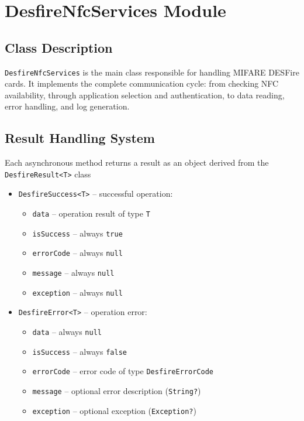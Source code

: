 \documentclass[a4paper,12pt]{article}
\begin{document}
\section{DesfireNfcServices Module}

\subsection{Class Description}
\texttt{DesfireNfcServices} is the main class responsible for handling MIFARE DESFire cards. It implements the complete communication cycle: from checking NFC availability, through application selection and authentication, to data reading, error handling, and log generation.

\subsection{Result Handling System}
Each asynchronous method returns a result as an object derived from the \texttt{DesfireResult<T>} class

\begin{itemize}
    \item \texttt{DesfireSuccess<T>} -- successful operation:
    \begin{itemize}
        \item \texttt{data} -- operation result of type \texttt{T}
        \item \texttt{isSuccess} -- always \texttt{true}
        \item \texttt{errorCode} -- always \texttt{null}
        \item \texttt{message} -- always \texttt{null}
        \item \texttt{exception} -- always \texttt{null}
    \end{itemize}
    \item \texttt{DesfireError<T>} -- operation error:
    \begin{itemize}
        \item \texttt{data} -- always \texttt{null}
        \item \texttt{isSuccess} -- always \texttt{false}
        \item \texttt{errorCode} -- error code of type \texttt{DesfireErrorCode}
        \item \texttt{message} -- optional error description (\texttt{String?})
        \item \texttt{exception} -- optional exception (\texttt{Exception?})
    \end{itemize}
\end{itemize}
\end{document}
